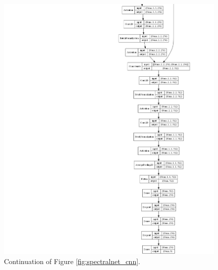 \begin{figure}[ht]
    \ContinuedFloat
    \centering
    \includegraphics[width=\linewidth]{figs/vineyard_classification/networks/spectral_net_24x23_64_02.png}
	\caption{Continuation of Figure \ref{fig:spectralnet_cnn}. }
	\label{fig:spectralnet_cnn_continuation}
\end{figure}

